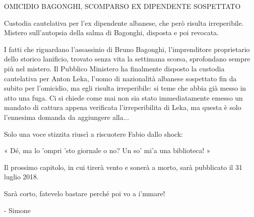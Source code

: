 OMICIDIO BAGONGHI, SCOMPARSO EX DIPENDENTE SOSPETTATO

Custodia cautelativa per l'ex dipendente albanese, che però risulta irreperibile. Mistero sull'autopsia della salma di Bagonghi, disposta e poi revocata.

I fatti che riguardano l'assassinio di Bruno Bagonghi, l'imprenditore proprietario dello storico lanificio, trovato senza vita la settimana scorsa, sprofondano sempre più nel mistero. Il Pubblico Ministero ha finalmente disposto la custodia cautelativa per Anton Leka, l'uomo di nazionalità albanese sospettato fin da subito per l'omicidio, ma egli risulta irreperibile: si teme che abbia già messo in atto una fuga. Ci si chiede come mai non sia stato immediatamente emesso un mandato di cattura appena verificata l'irreperibilita di Leka, ma questa è solo l'ennesima domanda da aggiungere alla...

Solo una voce stizzita riuscì a riscuotere Fabio dallo shock:

« Dé, ma lo 'ompri 'sto giornale o no? Un so' mi'a una biblioteca! »


Il prossimo capitolo, in cui tirerà vento e sonerà a morto, sarà pubblicato il 31 luglio 2018.

Sarà corto, fatevelo bastare perché poi vo a i'mmare!

- Simone
